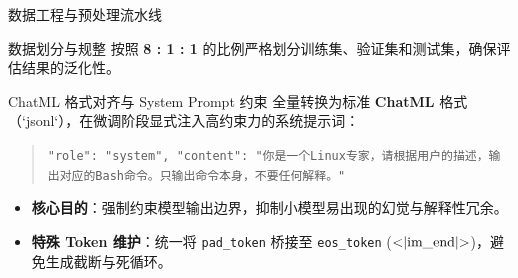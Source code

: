 \documentclass[aspectratio=169]{beamer}
\begin{document}
\begin{frame}{数据工程与预处理流水线}
    \begin{block}{数据划分与规整}
        按照 \textbf{8 : 1 : 1} 的比例严格划分训练集、验证集和测试集，确保评估结果的泛化性。
    \end{block}

    \begin{block}{ChatML 格式对齐与 System Prompt 约束}
        全量转换为标准 \textbf{ChatML} 格式（`jsonl`），在微调阶段显式注入高约束力的系统提示词：
        \vspace{0.2cm}
        \begin{quote}
            \small
            \color{darkgray}
            \texttt{"role": "system", "content": "你是一个Linux专家，请根据用户的描述，输出对应的Bash命令。只输出命令本身，不要任何解释。"}
        \end{quote}
        \vspace{0.2cm}
        \begin{itemize}
            \item \textbf{核心目的}：强制约束模型输出边界，抑制小模型易出现的幻觉与解释性冗余。
            \item \textbf{特殊 Token 维护}：统一将 \texttt{pad\_token} 桥接至 \texttt{eos\_token} ($\text{\textless|im\_end|\textgreater}$)，避免生成截断与死循环。
        \end{itemize}
    \end{block}
\end{frame}
\end{document}
